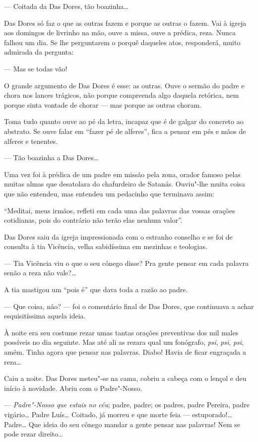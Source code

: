 --- Coitada da Das Dores, tão boazinha\ldots{}

Das Dores só faz o que as outras fazem e porque as outras o fazem. Vai à
igreja aos domingos de livrinho na mão, ouve a missa, ouve a prédica,
reza. Nunca falhou um dia. Se lhe perguntarem o porquê daqueles atos,
responderá, muito admirada da pergunta:

--- Mas se todas vão!

O grande argumento de Das Dores é esse: as outras. Ouve o sermão do
padre e chora nos lances trágicos, não porque compreenda algo daquela
retórica, nem porque sinta vontade de chorar --- mas porque as outras
choram.

Toma tudo quanto ouve ao pé da letra, incapaz que é de galgar do
concreto ao abstrato. Se ouve falar em ``fazer pé de alferes'', fica a
pensar em pés e mãos de alferes e tenentes.

--- Tão boazinha a Das Dores\ldots{}

Uma vez foi à prédica de um padre em missão pela zona, orador famoso
pelas muitas almas que desatolara do chafurdeiro de Satanás. Ouviu"-lhe
muita coisa que não entendeu, mas entendeu um pedacinho que terminava
assim:

``Meditai, meus irmãos, refleti em cada uma das palavras das vossas
orações cotidianas, pois do contrário não terão elas nenhum valor''.

Das Dores saiu da igreja impressionada com o estranho conselho e se foi
de consulta à tia Vicência, velha sabidíssima em mezinhas e teologias.

--- Tia Vicência viu o que o seu cônego disse? Pra gente pensar em cada
palavra senão a reza não vale?\ldots{}

A tia mastigou um ``pois é'' que dava toda a razão ao padre.

--- Que coisa, não? --- foi o comentário final de Das Dores, que
continuava a achar esquisitíssima aquela ideia.

À noite era seu costume rezar umas tantas orações preventivas dos mil
males possíveis no dia seguinte. Mas até ali as rezara qual um
fonógrafo, \emph{psi}, \emph{psi}, \emph{psi}, amém. Tinha agora que
pensar nas palavras. Diabo! Havia de ficar engraçada a reza\ldots{}

Caiu a noite. Das Dores meteu"-se na cama, cobriu a cabeça com o lençol e
deu início à novidade. Abriu com o Padre"-Nosso.

--- \emph{Padre"-Nosso que estais no céu}; padre, padre; os padres, padre
Pereira, padre vigário\ldots{} Padre Luís\ldots{} Coitado, já morreu e que morte
feia --- estuporado!\ldots{} Padre\ldots{} Que ideia do seu cônego mandar a gente
pensar nas palavras! Nem se pode rezar direito\ldots{}

